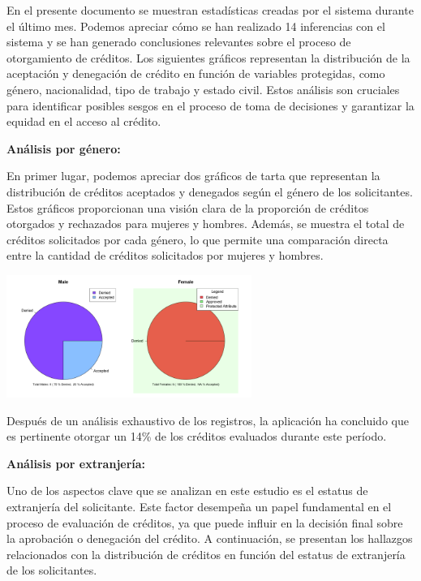 \documentclass{article}
\begin{document}
\begin{multicols}{2}

En el presente documento se muestran estadísticas creadas por el sistema durante el último mes. Podemos apreciar cómo se han realizado {\huge 14 inferencias} con el sistema y se han generado conclusiones relevantes sobre el proceso de otorgamiento de créditos. Los siguientes gráficos representan la distribución de la aceptación y denegación de crédito en función de variables protegidas, como género, nacionalidad, tipo de trabajo y estado civil. Estos análisis son cruciales para identificar posibles sesgos en el proceso de toma de decisiones y garantizar la equidad en el acceso al crédito.

\vspace{0.5cm}
\textbf{Análisis por género:}

En primer lugar, podemos apreciar dos gráficos de tarta que representan la distribución de créditos aceptados y denegados según el género de los solicitantes. Estos gráficos proporcionan una visión clara de la proporción de créditos otorgados y rechazados para mujeres y hombres. Además, se muestra el total de créditos solicitados por cada género, lo que permite una comparación directa entre la cantidad de créditos solicitados por mujeres y hombres.

\begin{center} %
    \includegraphics[width=8cm]{tex/media/gender.png} 
\end{center}

Después de un análisis exhaustivo de los registros, la aplicación ha concluido que es pertinente {\huge otorgar un 14\%} de los créditos evaluados durante este período.

\vspace{0.5cm}
\textbf{Análisis por extranjería:}

Uno de los aspectos clave que se analizan en este estudio es el estatus de extranjería del solicitante. Este factor desempeña un papel fundamental en el proceso de evaluación de créditos, ya que puede influir en la decisión final sobre la aprobación o denegación del crédito. A continuación, se presentan los hallazgos relacionados con la distribución de créditos en función del estatus de extranjería de los solicitantes.



\end{multicols}
\end{document}
